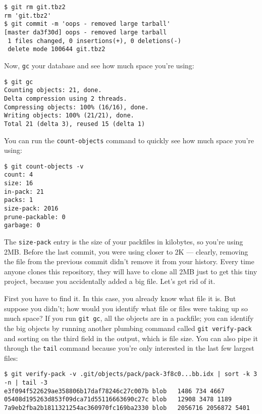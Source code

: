 \documentclass[a4paper]{book}
\newcounter{tab}[chapter]
\begin{document}
\begin{shaded}\begin{verbatim}
$ git rm git.tbz2
rm 'git.tbz2'
$ git commit -m 'oops - removed large tarball'
[master da3f30d] oops - removed large tarball
 1 files changed, 0 insertions(+), 0 deletions(-)
 delete mode 100644 git.tbz2
\end{verbatim}\end{shaded}

Now, \texttt{gc} your database and see how much space you're using:

\begin{shaded}\begin{verbatim}
$ git gc
Counting objects: 21, done.
Delta compression using 2 threads.
Compressing objects: 100% (16/16), done.
Writing objects: 100% (21/21), done.
Total 21 (delta 3), reused 15 (delta 1)
\end{verbatim}\end{shaded}

You can run the \texttt{count-objects} command to quickly see how much space you're using:

\begin{shaded}\begin{verbatim}
$ git count-objects -v
count: 4
size: 16
in-pack: 21
packs: 1
size-pack: 2016
prune-packable: 0
garbage: 0
\end{verbatim}\end{shaded}

The \texttt{size-pack} entry is the size of your packfiles in kilobytes, so you're using 2MB. Before the last commit, you were using closer to 2K --- clearly, removing the file from the previous commit didn't remove it from your history. Every time anyone clones this repository, they will have to clone all 2MB just to get this tiny project, because you accidentally added a big file. Let's get rid of it.

First you have to find it. In this case, you already know what file it is. But suppose you didn't; how would you identify what file or files were taking up so much space? If you run \texttt{git gc}, all the objects are in a packfile; you can identify the big objects by running another plumbing command called \texttt{git verify-pack} and sorting on the third field in the output, which is file size. You can also pipe it through the \texttt{tail} command because you're only interested in the last few largest files:

\begin{shaded}\begin{verbatim}
$ git verify-pack -v .git/objects/pack/pack-3f8c0...bb.idx | sort -k 3 -n | tail -3
e3f094f522629ae358806b17daf78246c27c007b blob   1486 734 4667
05408d195263d853f09dca71d55116663690c27c blob   12908 3478 1189
7a9eb2fba2b1811321254ac360970fc169ba2330 blob   2056716 2056872 5401
\end{verbatim}\end{shaded}
\end{document}
